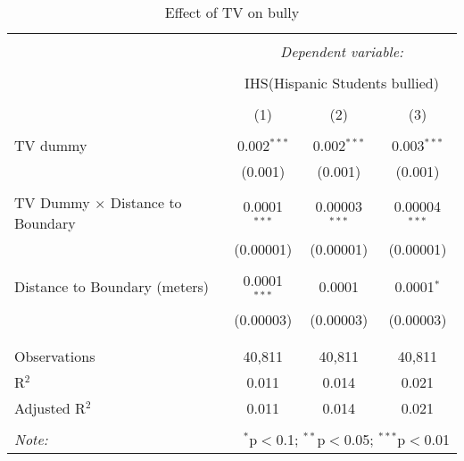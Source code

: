
\begin{table}[!htbp] \centering 
  \caption{Effect of TV on bully} 
  \label{} 
\begin{tabular}{@{\extracolsep{-2pt}}lccc} 
\\[-1.8ex]\hline 
\hline \\[-1.8ex] 
 & \multicolumn{3}{c}{\textit{Dependent variable:}} \\ 
\cline{2-4} 
\\[-1.8ex] & \multicolumn{3}{c}{IHS(Hispanic Students bullied)} \\ 
\\[-1.8ex] & (1) & (2) & (3)\\ 
\hline \\[-1.8ex] 
 TV dummy & 0.002$^{***}$ & 0.002$^{***}$ & 0.003$^{***}$ \\ 
  & (0.001) & (0.001) & (0.001) \\ 
  & & & \\ 
 TV Dummy $\times$ Distance to Boundary & 0.0001$^{***}$ & 0.00003$^{***}$ & 0.00004$^{***}$ \\ 
  & (0.00001) & (0.00001) & (0.00001) \\ 
  & & & \\ 
 Distance to Boundary (meters) & 0.0001$^{***}$ & 0.0001 & 0.0001$^{*}$ \\ 
  & (0.00003) & (0.00003) & (0.00003) \\ 
  & & & \\ 
\hline \\[-1.8ex] 
Observations & 40,811 & 40,811 & 40,811 \\ 
R$^{2}$ & 0.011 & 0.014 & 0.021 \\ 
Adjusted R$^{2}$ & 0.011 & 0.014 & 0.021 \\ 
\hline 
\hline \\[-1.8ex] 
\textit{Note:}  & \multicolumn{3}{r}{$^{*}$p$<$0.1; $^{**}$p$<$0.05; $^{***}$p$<$0.01} \\ 
\end{tabular} 
\end{table} 
